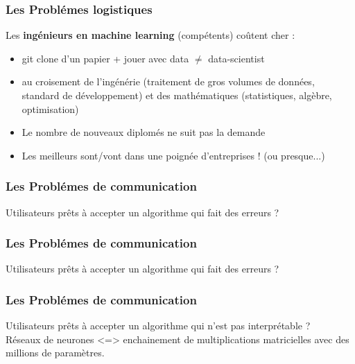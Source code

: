 \begin{frame}
  \frametitle{Les Problémes logistiques}
  Les \textbf{ingénieurs en machine learning} (compétents) coûtent cher :
  \begin{itemize}
  \item git clone d'un papier + jouer avec data $\neq$ data-scientist
  \item au croisement de l'ingénérie (traitement de gros volumes de données, standard de développement) et des mathématiques (statistiques, algèbre, optimisation)
  \item Le nombre de nouveaux diplomés ne suit pas la demande
  \item Les meilleurs sont/vont dans une poignée d'entreprises ! (ou presque...)
  \end{itemize}
\end{frame}

\begin{frame}
  \frametitle{Les Problémes de communication}
  Utilisateurs prêts à accepter un algorithme qui fait des erreurs ?
\end{frame}

\begin{frame}
  \frametitle{Les Problémes de communication}
  Utilisateurs prêts à accepter un algorithme qui fait des erreurs ?
\end{frame}

\begin{frame}
  \frametitle{Les Problémes de communication}
  Utilisateurs prêts à accepter un algorithme qui n'est pas interprétable ?\\
  Réseaux de neurones <=> enchainement de multiplications matricielles avec des millions de paramètres.
\end{frame}
